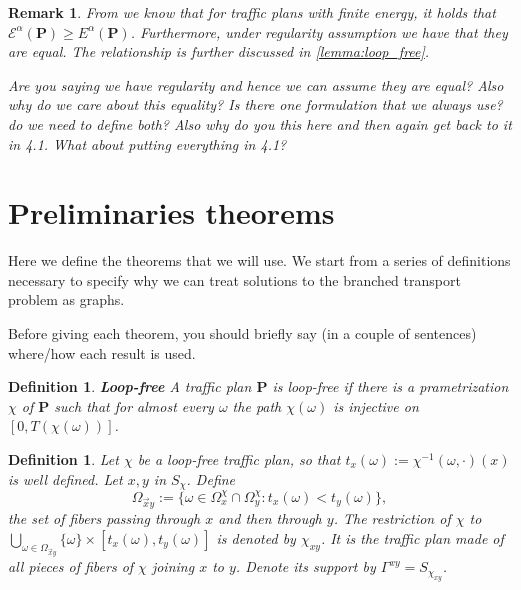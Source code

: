 \documentclass[11pt,reqno,a4paper]{amsart}
\numberwithin{equation}{section}
\theoremstyle{mytheorem}
\newtheorem{definition}[subsubsection]{Definition}
\theoremstyle{myremark}
\newtheorem{remark}[subsection]{Remark}
\theoremstyle{myparagraph}
\begin{document}
    \begin{remark}
        From \cite[Proposition 4.8]{Bernot} we know that for traffic plans with finite energy, it holds that $\mathcal{E} ^\alpha(\mathbf{P}) \ge E^\alpha (\mathbf{P})$.
        Furthermore, under regularity assumption \cite[definition 4.7]{Bernot} we have that they are equal.
        The relationship is further discussed in \ref{lemma:loop_free}.

            {\color{red} Are you saying we have regularity and hence we can assume they are equal?
        Also why do we care about this equality? Is there one formulation that we always use? do we need to define both?
        Also why do you this here and then again get back to it in 4.1. What about putting everything in 4.1?}
    \end{remark}


    \section{Preliminaries theorems}

    Here we define the theorems that we will use. We start from a series of definitions necessary to specify why we can
    treat solutions to the branched transport problem as graphs.

        {\color{red} Before giving each theorem, you should briefly say (in a couple of sentences) where/how each result is used.}

    \begin{definition}
        \textbf{Loop-free}
        A traffic plan $\mathbf{P}$ is loop-free if there is a prametrization $\chi$ of $\mathbf{P}$ such that for almost every $\omega$
        the path $\chi(\omega)$ is injective on $[0, T(\chi(\omega))]$.
    \end{definition}

    \begin{definition}
        Let $\chi$ be a loop-free traffic plan, so that $t_x(\omega) := \chi^{-1}(\omega, \cdot)(x)$ is well defined.
        Let $x, y$ in $S_\chi$. Define
        \[
            \Omega_{\overset{\rightarrow}{x}y} := \{\omega \in \Omega_x^\chi \cap \Omega_y^\chi : t_x(\omega) < t_y(\omega)\},
        \]
        the set of fibers passing through $x$ and then through $y$.
        The restriction of $\chi$ to $\bigcup_{\omega \in \Omega_{\overset{\rightarrow}{x}y}} \{\omega\} \times [t_x(\omega), t_y(\omega)]$ is denoted by $\chi_{xy}$.
        It is the traffic plan made of all pieces of fibers of $\chi$ joining $x$ to $y$. Denote its support by $\Gamma^{xy} = S_{\chi_{xy}}$.

    \end{definition}
\end{document}
